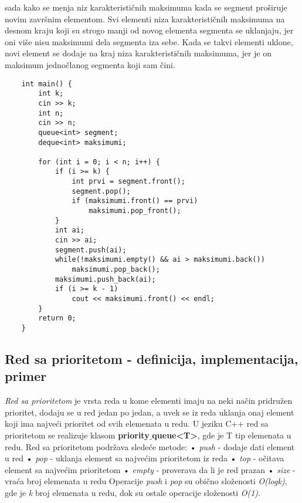 \documentclass{article}
\begin{document}
sada kako se menja niz karakterističnih maksimuma kada se segment proširuje
novim završnim elementom. Svi elementi niza karakterističnih maksimuma na
desnom kraju koji su strogo manji od novog elementa segmenta se uklanjaju, jer
oni više nisu maksimumi dela segmenta iza sebe. Kada se takvi elementi uklone, novi element se dodaje na kraj niza karakterističnih
maksimuma, jer je on maksimum jednočlanog segmenta koji sam čini.
\begin{lstlisting}
    int main() {
        int k;
        cin >> k;
        int n;
        cin >> n;
        queue<int> segment;
        deque<int> maksimumi;

        for (int i = 0; i < n; i++) {
            if (i >= k) {
                int prvi = segment.front();
                segment.pop();
                if (maksimumi.front() == prvi)
                    maksimumi.pop_front();
            }
            int ai;
            cin >> ai;
            segment.push(ai);
            while(!maksimumi.empty() && ai > maksimumi.back())
                maksimumi.pop_back();
            maksimumi.push_back(ai);
            if (i >= k - 1)
                cout << maksimumi.front() << endl;
        }   
        return 0;
    }
\end{lstlisting}

\subsection{Red sa prioritetom - definicija, implementacija, primer}
\textit{Red sa prioritetom} je vrsta reda u kome elementi imaju na neki način pridružen
prioritet, dodaju se u red jedan po jedan, a uvek se iz reda uklanja onaj element
koji ima najveći prioritet od svih elemenata u redu.
U jeziku C++ red sa prioritetom se realizuje klasom \textbf{priority$\_$queue<T>}, gde
je T tip elemenata u redu. Red sa prioritetom podržava sledeće metode:
\newline \hspace*{0.4cm}• \textit{push} - dodaje dati element u red
\newline \hspace*{0.4cm}• \textit{pop} - uklanja element sa najvećim prioritetom iz reda
\newline \hspace*{0.4cm}• \textit{top} - očitava element sa najvećim prioritetom 
\newline \hspace*{0.4cm}• \textit{empty} - proverava da li je red prazan
\newline \hspace*{0.4cm}• \textit{size} - vraća broj elemenata u redu
\newline Operacije \textit{push} i \textit{pop} su obično složenosti \textit{O(logk)}, gde je \textit{k} broj elemenata u
redu, dok su ostale operacije složenosti \textit{O(1)}.
\end{document}
